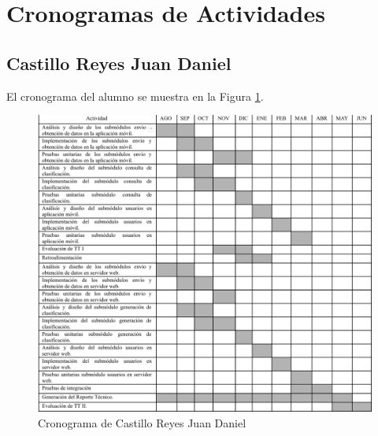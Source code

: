 \section{Cronogramas de Actividades}
\subsection{Castillo Reyes Juan Daniel}
El cronograma del alumno se muestra en la Figura \ref{fig:cronograma_batiz}.
\begin{figure}[H]
	\centering
	\includegraphics[width=1\textwidth]{Apendice1/cronogramas/batiz}
	\caption{Cronograma de Castillo Reyes Juan Daniel}
	\label{fig:cronograma_batiz}
\end{figure}

